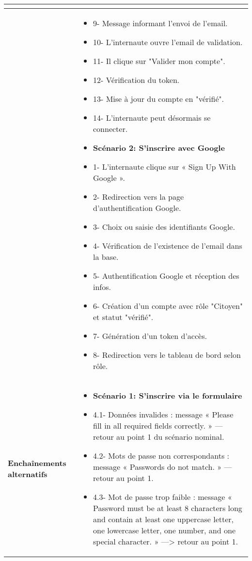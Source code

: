 \begin{longtable}{|>{\arraybackslash}p{4.2cm}|>{\arraybackslash}p{12.5cm}|}
\begin{itemize}[label=]
\end{itemize} \\
\hline
\textbf{}&
\begin{itemize}[label=]
    \item 9- Message informant l'envoi de l'email.
    \item 10- L'internaute ouvre l'email de validation.
    \item 11- Il clique sur "Valider mon compte".
    \item 12- Vérification du token.
    \item 13- Mise à jour du compte en "vérifié".
    \item 14- L'internaute peut désormais se connecter.
    \item \textbf{Scénario 2: S'inscrire avec Google}
    \item 1- L'internaute clique sur « Sign Up With Google ».
    \item 2- Redirection vers la page d'authentification Google.
    \item 3- Choix ou saisie des identifiants Google.
    \item 4- Vérification de l'existence de l'email dans la base.
    \item 5- Authentification Google et réception des infos.
    \item 6- Création d'un compte avec rôle "Citoyen" et statut "vérifié".
    \item 7- Génération d'un token d'accès.
    \item 8- Redirection vers le tableau de bord selon rôle.
\end{itemize}\\
\hline
\textbf{Enchaînements alternatifs} &
\begin{itemize}[label=]
    \item \textbf{Scénario 1: S'inscrire via le formulaire}
    \item 4.1- Données invalides : message « Please fill in all required fields correctly. » — retour au point 1 du scénario nominal.
    \item 4.2- Mots de passe non correspondants : message « Passwords do not match. » — retour au point 1.
    \item 4.3- Mot de passe trop faible : message « Password must be at least 8 characters long and contain at least one uppercase letter, one lowercase letter, one number, and one special character. » —> retour au point 1.


\end{itemize}
\end{longtable}
